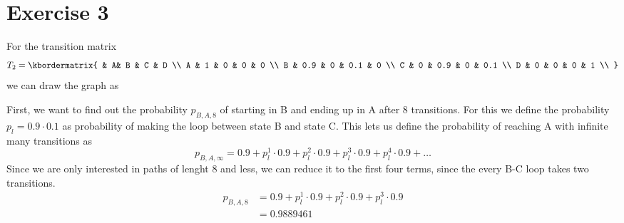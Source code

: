 \documentclass{article}
\begin{document}
\section*{Exercise 3}
For the transition matrix
\[
T_2 = 
\kbordermatrix{
    & A& B     &  C & D     \\
A &   1   &   0   &   0   &   0   \\ 
B &   0.9   &   0   &   0.1   &   0  \\ 
C &   0   &   0.9   &   0   &   0.1   \\ 
D &   0   &   0   &   0   &   1   \\ 
}
\]
we can draw the graph as
\begin{figure}[h]
\center
{}
\end{figure}
First, we want to find out the probability $p_{B,A,8}$ of starting in B and ending up in A
after 8 transitions. For this we define the probability $p_l = 0.9 \cdot 0.1$ as probability of making
the loop between state B and state C. This lets us define the probability of reaching A
with infinite many transitions as
\begin{equation}
	p_{B,A,\infty} = 0.9 + p_l^1 \cdot 0.9 + p_l^2 \cdot 0.9 + p_l^3 \cdot 0.9 +  p_l^4 \cdot 0.9 + \ldots
\end{equation}
Since we are only interested in paths of lenght 8 and less, we can reduce it to the 
first four terms, since the every B-C loop takes two transitions.
\begin{align}
	p_{B,A,8} 	&= 0.9 + p_l^1 \cdot 0.9 + p_l^2 \cdot 0.9 + p_l^3 \cdot 0.9 \\
				&= 0.9889461
\end{align}
\end{document}
